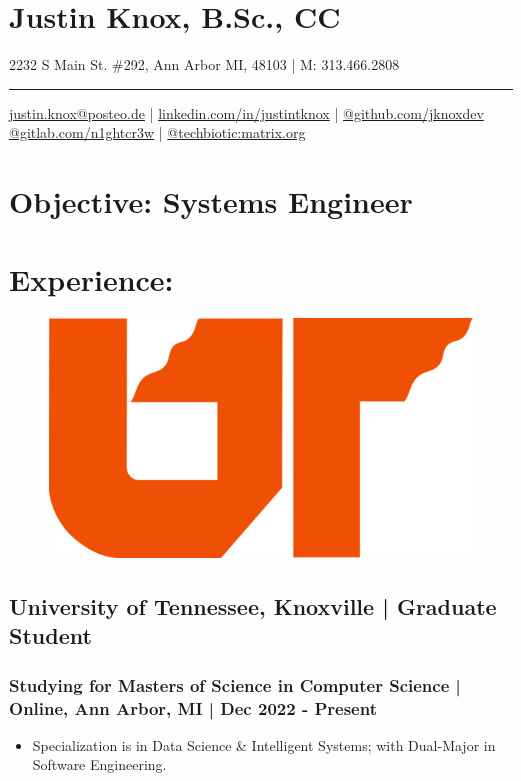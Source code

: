 \documentclass[letter,10pt]{article}
\author{arx}
\date{\today}
\title{}
\begin{document}
\section*{Justin Knox, B.Sc., CC}
\label{sec:org0462e0a}
2232 S Main St. \#292, Ann Arbor MI, 48103 | M: 313.466.2808

\noindent\rule{\textwidth}{0.5pt}
\href{mailto:justin.knox@posteo.de}{justin.knox@posteo.de} | \href{https://www.linkedin.com/in/justintknox}{linkedin.com/in/justintknox} | \href{https://www.github.com/jknoxdev}{@github.com/jknoxdev} \\
\href{https://gitlab.com/n1ghtcr3w}{@gitlab.com/n1ghtcr3w} | \href{https://matrix.to/\#/@techbiotic:matrix.org}{@techbiotic:matrix.org}


\section*{Objective:              Systems Engineer}
\label{sec:orgcd2a123}
\section*{Experience:}
\label{sec:orgee2cdc1}
\begin{figure}
\includegraphics[width=0.45\linewidth]{./img/50p_cr_utk.jpg}
\end{figure}

\subsection*{University of Tennessee, Knoxville | Graduate Student}
\label{sec:org613d114}
\subsubsection*{Studying for Masters of Science in Computer Science | Online, Ann Arbor, MI | Dec 2022 - Present}
\label{sec:org661ff96}
\begin{itemize}
\item Specialization is in Data Science \& Intelligent Systems; with Dual-Major in Software Engineering.
\end{itemize}
\end{document}
